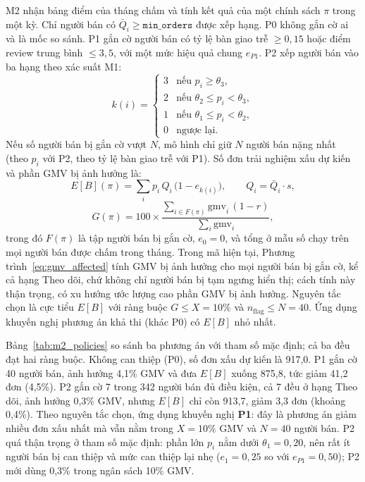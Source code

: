 \documentclass[a4paper]{article}
\begin{document}
M2 nhận bảng điểm của tháng chấm và tính kết quả của một chính sách $\pi$ trong một kỳ. Chỉ người bán có $\bar{Q}_i \ge \texttt{min\_orders}$ được xếp hạng. P0 không gắn cờ ai và là mốc so sánh. P1 gắn cờ người bán có tỷ lệ bàn giao trễ $\ge 0{,}15$ hoặc điểm review trung bình $\le 3{,}5$, với một mức hiệu quả chung $e_{P1}$. P2 xếp người bán vào ba hạng theo xác suất M1:
\begin{equation}
\label{eq:tier}
k(i) =
\begin{cases}
3 & \text{nếu } p_i \ge \theta_3,\\
2 & \text{nếu } \theta_2 \le p_i < \theta_3,\\
1 & \text{nếu } \theta_1 \le p_i < \theta_2,\\
0 & \text{ngược lại.}
\end{cases}
\end{equation}
Nếu số người bán bị gắn cờ vượt $N$, mô hình chỉ giữ $N$ người bán nặng nhất (theo $p_i$ với P2, theo tỷ lệ bàn giao trễ với P1). Số đơn trải nghiệm xấu dự kiến và phần GMV bị ảnh hưởng là:
\begin{equation}
\label{eq:expected_bad}
E[B](\pi) = \sum_{i} p_i \, Q_i \, \bigl(1 - e_{k(i)}\bigr), \qquad Q_i = \bar{Q}_i \cdot s,
\end{equation}
\begin{equation}
\label{eq:gmv_affected}
G(\pi) = 100 \times \frac{\sum_{i \in F(\pi)} \text{gmv}_i \, (1 - r)}{\sum_{i} \text{gmv}_i},
\end{equation}
trong đó $F(\pi)$ là tập người bán bị gắn cờ, $e_0 = 0$, và tổng ở mẫu số chạy trên mọi người bán được chấm trong tháng. Trong mã hiện tại, Phương trình~\eqref{eq:gmv_affected} tính GMV bị ảnh hưởng cho mọi người bán bị gắn cờ, kể cả hạng Theo dõi, chứ không chỉ người bán bị tạm ngưng hiển thị; cách tính này thận trọng, có xu hướng ước lượng cao phần GMV bị ảnh hưởng.
Nguyên tắc chọn là cực tiểu $E[B]$ với ràng buộc $G \le X = 10\%$ và $n_{\text{flag}} \le N = 40$. Ứng dụng khuyến nghị phương án khả thi (khác P0) có $E[B]$ nhỏ nhất.

Bảng~\ref{tab:m2_policies} so sánh ba phương án với tham số mặc định; cả ba đều đạt hai ràng buộc. Không can thiệp (P0), số đơn xấu dự kiến là 917,0. P1 gắn cờ 40 người bán, ảnh hưởng 4,1\% GMV và đưa $E[B]$ xuống 875,8, tức giảm 41,2 đơn (4,5\%). P2 gắn cờ 7 trong 342 người bán đủ điều kiện, cả 7 đều ở hạng Theo dõi, ảnh hưởng 0,3\% GMV, nhưng $E[B]$ chỉ còn 913,7, giảm 3,3 đơn (khoảng 0,4\%). Theo nguyên tắc chọn, ứng dụng khuyến nghị \textbf{P1}: đây là phương án giảm nhiều đơn xấu nhất mà vẫn nằm trong $X = 10\%$ GMV và $N = 40$ người bán. P2 quá thận trọng ở tham số mặc định: phần lớn $p_i$ nằm dưới $\theta_1 = 0{,}20$, nên rất ít người bán bị can thiệp và mức can thiệp lại nhẹ ($e_1 = 0{,}25$ so với $e_{P1} = 0{,}50$); P2 mới dùng 0,3\% trong ngân sách 10\% GMV.
\end{document}
